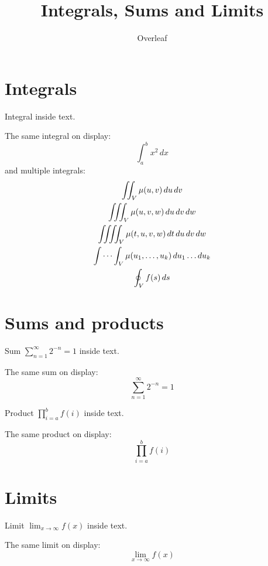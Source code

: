 \documentclass{article}
\title{Integrals, Sums and Limits}
\author{Overleaf}
\date{}
\begin{document}
\maketitle

\section{Integrals}

Integral  inside text.

\medskip

The same integral on display:
\[
    \int_{a}^{b} x^2 \,dx
\]
and multiple integrals:
\begin{gather*}
    \iint_V \mu(u,v) \,du\,dv
\\
    \iiint_V \mu(u,v,w) \,du\,dv\,dw
\\
    \iiiint_V \mu(t,u,v,w) \,dt\,du\,dv\,dw
\\
    \idotsint_V \mu(u_1,\dots,u_k) \,du_1 \dots du_k
\\
    \oint_V f(s) \,ds
\end{gather*}

\section{Sums and products}

Sum $\sum_{n=1}^{\infty} 2^{-n} = 1$ inside text.

The same sum on display:
\[
    \sum_{n=1}^{\infty} 2^{-n} = 1
\]

Product $\prod_{i=a}^{b} f(i)$ inside text.

The same product on display:
\[
    \prod_{i=a}^{b} f(i)
\]

\section{Limits}

Limit $\lim_{x\to\infty} f(x)$ inside text.

The same limit on display:
\[
    \lim_{x\to\infty} f(x)
\]
\end{document}
